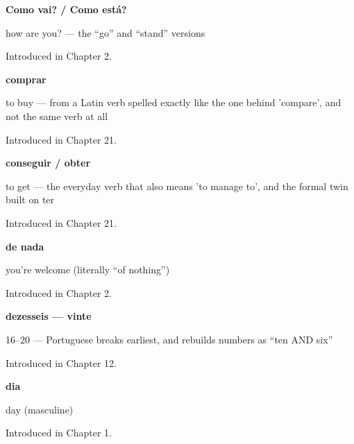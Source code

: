 \noindent\begin{minipage}[t]{\linewidth}
\raggedright
\textbf{Como vai? / Como está?}\par
\small how are you? — the “go” and “stand” versions\par
\footnotesize Introduced in Chapter 2.
\end{minipage}\par\medskip

\noindent\begin{minipage}[t]{\linewidth}
\raggedright
\textbf{comprar}\par
\small to buy — from a Latin verb spelled exactly like the one behind 'compare', and not the same verb at all\par
\footnotesize Introduced in Chapter 21.
\end{minipage}\par\medskip

\noindent\begin{minipage}[t]{\linewidth}
\raggedright
\textbf{conseguir / obter}\par
\small to get — the everyday verb that also means 'to manage to', and the formal twin built on ter\par
\footnotesize Introduced in Chapter 21.
\end{minipage}\par\medskip

\noindent\begin{minipage}[t]{\linewidth}
\raggedright
\textbf{de nada}\par
\small you're welcome (literally \textquotedblleft{}of nothing\textquotedblright{})\par
\footnotesize Introduced in Chapter 2.
\end{minipage}\par\medskip

\noindent\begin{minipage}[t]{\linewidth}
\raggedright
\textbf{dezesseis — vinte}\par
\small 16–20 — Portuguese breaks earliest, and rebuilds numbers as \textquotedblleft{}ten AND six\textquotedblright{}\par
\footnotesize Introduced in Chapter 12.
\end{minipage}\par\medskip

\noindent\begin{minipage}[t]{\linewidth}
\raggedright
\textbf{dia}\par
\small day (masculine)\par
\footnotesize Introduced in Chapter 1.
\end{minipage}\par\medskip

